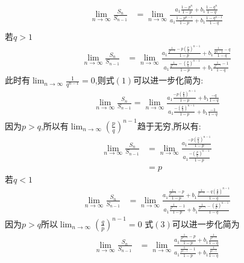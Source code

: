 \documentclass[answers]{exam}
\begin{document}
\begin{questions}
	\begin{solution}
		\begin{align*}
			\lim_{n\to\infty}\frac{S_n}{S_{n-1}}
			 & = \lim_{n\to\infty}\frac{a_1\frac{1-p^n}{1-p}+b_1\frac{1-q^n}{1-q}}{a_1\frac{1-p^{n-1}}{1-p}+b_1\frac{1-q^{n-1}}{1-q}} \\
		\end{align*}
		若$q>1$
		\begin{align*}
			\lim_{n\to\infty}\frac{S_n}{S_{n-1}}
			 & =\lim_{n\to\infty}\frac{a_1\frac{\frac{1}{q^{n-1}}- p\left( \frac{p}{q} \right)^{n-1}}{1-p} +
				b_1\frac{\frac{1}{q{n-1}}-q}{1-q}}
			{a_1\frac{\frac{1}{q^{n-1}}- \left( \frac{p}{q} \right)^{n-1}}{1-p} + b_1\frac{\frac{1}{q^{n-1}}-1}{1-q}}
			\tag{1}
		\end{align*}
		此时有$\displaystyle\lim_{n\to\infty}\frac{1}{q^{n-1}}=0$,则式$(1)$可以进一步化简为:
		\begin{align*}
			\lim_{n\to\infty}\frac{S_n}{S_{n-1}} = \lim_{n\to\infty}\frac{a_1\frac{-p \left( \frac{p}{q}
					\right)^{n-1}}{1-p} + b_1\frac{-q}{1-q}}
			{a_1\frac{-\left( \frac{p}{q} \right)^{n-1}}{1-p} + b_1\frac{-1}{1-q}}
		\end{align*}
		因为$p>q$,所以有$\displaystyle\lim_{n\to\infty}\left( \frac{p}{q} \right)^{n-1}$趋于无穷,所以有:
		\begin{align*}
			\lim_{n\to\infty}\frac{S_n}{S_{n-1}} & = \lim_{n\to\infty}\frac{a_1\frac{-p \left( \frac{p}{q}
			\right)^{n-1}}{1-p}}{a_1\frac{-\left( \frac{p}{q}\right)^{n-1}}{1-p}}                          \\
			                                     & = p
		\end{align*}
		若$q<1$
		\begin{align*}
			\lim_{n\to\infty}\frac{S_n}{S_{n-1}}
			 & = \lim_{n\to\infty}\frac{a_1\frac{\frac{1}{p^{n-1}}-p}{1-p} + b_1\frac{\frac{1}{p^{n-1}}-q \left(
					\frac{q}{p} \right)^{n-1}}{1-q}}
			{a_1\frac{\frac{1}{p^{n-1}}-1}{1-p} + b_1\frac{\frac{1}{p^{n-1}}- \left( \frac{q}{p} \right)^{n-1}}{1-q}}
			\tag{3}
		\end{align*}
		因为$p> q$所以$\displaystyle\lim_{n\to\infty}\left(  \frac{q}{p}\right)^{n-1} = 0$
		式$(3)$可以进一步化简为
		\begin{align*}
			\lim_{n\to\infty}\frac{S_n}{S_{n-1}} & =
			\lim_{n\to\infty}\frac{a_1\frac{\frac{1}{p^{n-1}}-p}{1-p}+b_1\frac{\frac{1}{p^{n-1}}}{1-q}}
			{a_1\frac{\frac{1}{p^{n-1}}-1}{1-p} + b_1\frac{\frac{1}{p^{n-1}}}{1-q}} \tag{4}
		\end{align*}

\end{solution}
\end{questions}
\end{document}
